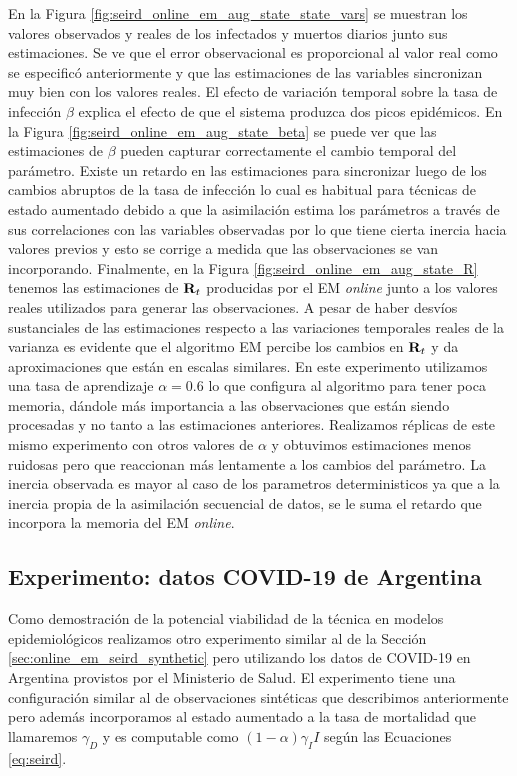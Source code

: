 En la Figura \ref{fig:seird_online_em_aug_state_state_vars} se muestran los valores observados y reales de los infectados y muertos diarios junto sus estimaciones. Se ve que el error observacional es proporcional al valor real como se especificó anteriormente y que las estimaciones de las variables sincronizan muy bien con los valores reales. El efecto de variación temporal sobre la tasa de infección $\beta$ explica el efecto de que el sistema produzca dos picos epidémicos. En la Figura \ref{fig:seird_online_em_aug_state_beta} se puede ver que las estimaciones de $\beta$ pueden capturar correctamente el cambio temporal del parámetro. Existe un retardo en las estimaciones para sincronizar luego de los cambios abruptos de la tasa de infección lo cual es habitual para técnicas de estado aumentado debido a que la asimilación estima los parámetros a través de sus correlaciones con las variables observadas por lo que tiene cierta inercia hacia valores previos y esto se corrige a medida que las observaciones se van incorporando. Finalmente, en la Figura \ref{fig:seird_online_em_aug_state_R} tenemos las estimaciones de $\mathbf{R}_t$ producidas por el EM \textit{online} junto a los valores reales utilizados para generar las observaciones. A pesar de haber desvíos sustanciales de las estimaciones respecto a las variaciones temporales reales de la varianza es evidente que el algoritmo EM percibe los cambios en $\mathbf{R}_t$ y da aproximaciones que están en escalas similares. En este experimento utilizamos una tasa de aprendizaje $\alpha = 0.6$ lo que configura al algoritmo para tener poca memoria, dándole más importancia a las observaciones que están siendo procesadas y no tanto a las estimaciones anteriores. Realizamos réplicas de este mismo experimento con otros valores de $\alpha$ y obtuvimos estimaciones menos ruidosas pero que reaccionan más lentamente a los cambios del parámetro. La inercia observada es mayor al caso de los parametros deterministicos ya que a la inercia propia de la asimilación secuencial de datos, se le suma el retardo que incorpora la memoria del EM \textit{online}.

\subsection{Experimento: datos COVID-19 de Argentina}
Como demostración de la potencial viabilidad de la técnica en modelos epidemiológicos realizamos otro experimento similar al de la Sección \ref{sec:online_em_seird_synthetic} pero utilizando los datos de COVID-19 en Argentina provistos por el Ministerio de Salud. El experimento tiene una configuración similar al de observaciones sintéticas que describimos anteriormente pero además incorporamos al estado aumentado a la tasa de mortalidad que llamaremos $\gamma_D$ y es computable como $(1-\alpha) \gamma_I I$ según las Ecuaciones \ref{eq:seird}.

